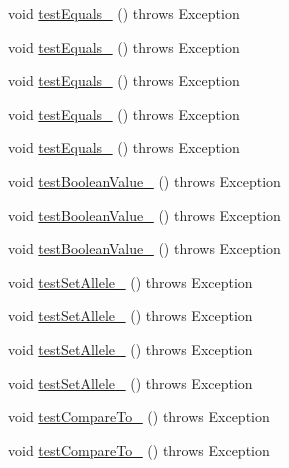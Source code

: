 \begin{DoxyCompactItemize}
void \hyperlink{classorg_1_1jgap_1_1impl_1_1_boolean_gene_test_a7a21882ce5db97c2325dccdc9f41a5e5}{test\-Equals\-\_} ()  throws Exception 
\item 
void \hyperlink{classorg_1_1jgap_1_1impl_1_1_boolean_gene_test_a05a9e689983cbe6b16954de35b40099f}{test\-Equals\-\_} ()  throws Exception 
\item 
void \hyperlink{classorg_1_1jgap_1_1impl_1_1_boolean_gene_test_ace1a4026f4d48b825565825e94993f40}{test\-Equals\-\_} ()  throws Exception 
\item 
void \hyperlink{classorg_1_1jgap_1_1impl_1_1_boolean_gene_test_af3c953006ebe11778484ecd28947b8f0}{test\-Equals\-\_} ()  throws Exception 
\item 
void \hyperlink{classorg_1_1jgap_1_1impl_1_1_boolean_gene_test_a914458aabdc93f1c0a1344b705ef27b8}{test\-Equals\-\_} ()  throws Exception 
\item 
void \hyperlink{classorg_1_1jgap_1_1impl_1_1_boolean_gene_test_ad7ae6783919eec2b4d34d13ef837daf2}{test\-Boolean\-Value\-\_} ()  throws Exception 
\item 
void \hyperlink{classorg_1_1jgap_1_1impl_1_1_boolean_gene_test_a3f2c025085453fe93228b1143c734cd2}{test\-Boolean\-Value\-\_} ()  throws Exception 
\item 
void \hyperlink{classorg_1_1jgap_1_1impl_1_1_boolean_gene_test_a739d7ae711471785509432c021837a1c}{test\-Boolean\-Value\-\_} ()  throws Exception 
\item 
void \hyperlink{classorg_1_1jgap_1_1impl_1_1_boolean_gene_test_ab7d4e208056a4a042057b94e3bb938bf}{test\-Set\-Allele\-\_} ()  throws Exception 
\item 
void \hyperlink{classorg_1_1jgap_1_1impl_1_1_boolean_gene_test_a4812a2d5e07ba2893724294c3518583c}{test\-Set\-Allele\-\_} ()  throws Exception 
\item 
void \hyperlink{classorg_1_1jgap_1_1impl_1_1_boolean_gene_test_af31cb99a5ca6d6e2c64c685153f1e83f}{test\-Set\-Allele\-\_} ()  throws Exception 
\item 
void \hyperlink{classorg_1_1jgap_1_1impl_1_1_boolean_gene_test_a49197400d0d0a4740ba43a94d777820a}{test\-Set\-Allele\-\_} ()  throws Exception 
\item 
void \hyperlink{classorg_1_1jgap_1_1impl_1_1_boolean_gene_test_a504b1c6fd4473152ac9ef6008a49c30d}{test\-Compare\-To\-\_} ()  throws Exception 
\item 
void \hyperlink{classorg_1_1jgap_1_1impl_1_1_boolean_gene_test_a2e9420715977a791768ce38e58a2d2ea}{test\-Compare\-To\-\_} ()  throws Exception 

\end{DoxyCompactItemize}
